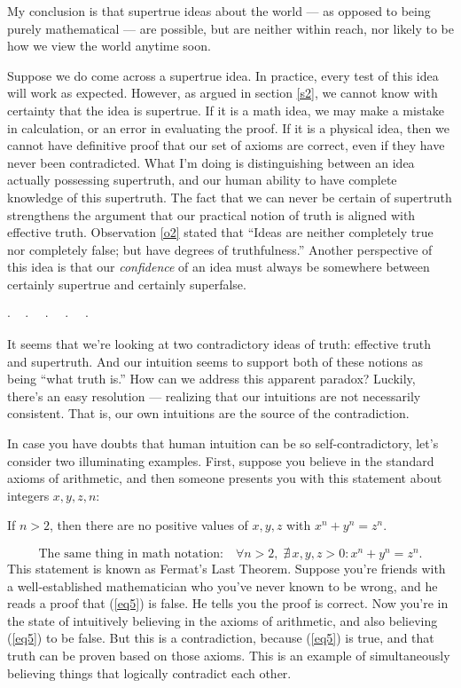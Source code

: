 \documentclass[11pt, oneside]{article}   	%
\newcommand{\dotq}{\cdot\quad}
\newcommand{\scenebreak}{
    \medskip\centerline{$\dotq\dotq\dotq\dotq\cdot$}\medskip
}
\begin{document}
My conclusion is
that supertrue ideas about the world --- as opposed to being purely
mathematical --- are possible, but are neither within reach,
nor likely to be how we view the world anytime soon.

Suppose we do come across a supertrue idea. In practice, every test of this idea
will work as expected.
However, as argued in section \ref{s2}, we cannot know with certainty that
the idea is supertrue. If it is a math idea, we may make a mistake in
calculation, or an error in evaluating the proof. If it is a physical idea, then
we cannot have definitive proof that our set of axioms are correct, even if they
have never been contradicted. What I'm doing is distinguishing between an idea
actually possessing supertruth, and our human ability to have complete knowledge
of this supertruth. The fact that we can never be certain of supertruth
strengthens the argument that our practical notion of truth is aligned with
effective truth. Observation \ref{o2} stated that ``Ideas
are neither completely true nor completely false; but have degrees
of truthfulness.''
Another perspective of this idea is that
our {\em confidence} of an idea must always be somewhere between certainly
supertrue and certainly superfalse.

\scenebreak

It seems that we're looking at two contradictory ideas of truth: effective
truth and supertruth. And our intuition seems to support both of these notions
as being ``what truth is.'' How can we address this apparent paradox?
Luckily, there's an easy resolution --- realizing that our intuitions are not
necessarily consistent. That is, our own intuitions are the source of the
contradiction.

In case you have doubts that human intuition can be so self-contradictory, let's
consider two illuminating examples. First, suppose you believe in the standard
axioms of arithmetic, and then someone presents you with this statement about
integers $x,y,z,n$:
\begin{center}
    If $n>2$, then there are no positive values of $x,y,z$ with
    $x^n+y^n=z^n$.
\end{center}
\begin{equation}\label{eq5}
    \text{The same thing in math notation:}\quad
    \forall n>2,\; \nexists\, x,y,z>0: x^n + y^n = z^n.
\end{equation}
This statement is known as Fermat's Last Theorem.
Suppose you're friends with a well-established mathematician who you've never
known to be wrong, and he reads a proof that (\ref{eq5}) is false. He tells you
the proof is correct.
Now you're in the state of intuitively believing in the axioms of arithmetic,
and also believing (\ref{eq5}) to be false.
But this is a contradiction, because
(\ref{eq5}) is true, and that truth can be proven based on those axioms. This is
an example of simultaneously believing things that logically contradict each
other.
\end{document}
